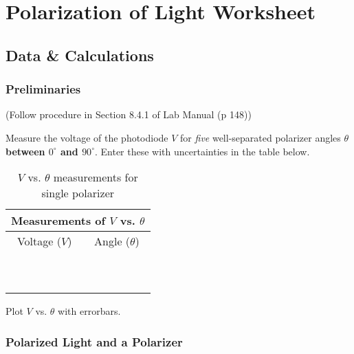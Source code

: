 \vfill
\pagebreak


\renewcommand{\thesection}{\thechapter.W}


\section{Polarization of Light Worksheet}
\subsection{Data \& Calculations}

\subsubsection{Preliminaries}

(Follow procedure in Section 8.4.1 of Lab Manual (p 148))
\vspace*{.5cm}

\noindent
Measure the voltage of the photodiode $V$ for {\it five} well-separated polarizer
angles $\theta$
{\bf between $0^{\circ}$ and $90^{\circ}.$} Enter these with uncertainties in the table
below.

\begin{table}[htb]
\begin{center}
\begin{tabular}{|c|c|}
\hline
\multicolumn{2}{|c|}{Measurements of $V$ vs. $\theta$} \\
\hline
Voltage ($V$) & Angle ($\theta$)  \\
\hline
\hspace*{3cm} & \hspace*{3cm}  \\
&   \\
\hline
&   \\
&  \\
\hline
& \\
& \\
\hline
&  \\
&  \\
\hline
&  \\
&  \\
\hline
\end{tabular}
\end{center}
\caption{$V$ vs. $\theta$ measurements for single polarizer}
\label {tab:PO:1lens}
\end{table}

\noindent
Plot $V$ vs. $\theta$ with errorbars.

\subsubsection{Polarized Light and a Polarizer}

